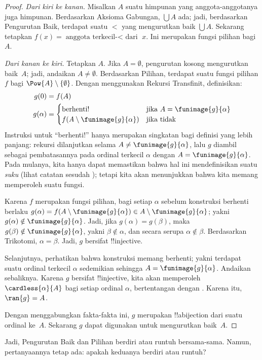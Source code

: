 \documentclass[../../../include/open-logic-section]{subfiles}
\begin{document}
\begin{proof}
\emph{Dari kiri ke kanan.} Misalkan $A$ suatu himpunan yang
anggota-anggotanya juga himpunan. Berdasarkan Aksioma Gabungan,
$\bigcup A$ ada; jadi, berdasarkan Pengurutan Baik, terdapat suatu $<$ yang
mengurutkan baik $\bigcup A$. Sekarang tetapkan
$f(x)=\text{anggota terkecil-$<$ dari }x$. Ini merupakan fungsi pilihan
bagi~$A$.

\emph{Dari kanan ke kiri.} Tetapkan $A$. Jika $A=\emptyset$, pengurutan
kosong mengurutkan baik~$A$; jadi, andaikan $A\neq\emptyset$. Berdasarkan
Pilihan, terdapat suatu fungsi pilihan $f$ bagi
$\Pow{A} \setminus \{\emptyset\}$. Dengan menggunakan Rekursi Transfinit,
definisikan:
\begin{align*}
	g(0) &= f(A)\\
	g(\alpha) &=
		\begin{cases}
			\text{berhenti!{}} &\text{jika }A = \funimage{g}{\alpha}\\
			f(A \setminus \funimage{g}{\alpha}) & \text{jika tidak}\\
		\end{cases}
\end{align*}
Instruksi untuk ``berhenti!'' hanya merupakan singkatan bagi definisi
yang lebih panjang: rekursi dilanjutkan selama
$A\neq\funimage{g}{\alpha}$, lalu $g$ diambil sebagai pembatasannya pada
ordinal terkecil $\alpha$ dengan $A=\funimage{g}{\alpha}$. Pada mulanya, kita
hanya dapat memastikan bahwa hal ini mendefinisikan suatu \emph{suku}
(lihat catatan sesudah
); tetapi kita akan
menunjukkan bahwa kita memang memperoleh suatu fungsi.

Karena $f$ merupakan fungsi pilihan, bagi setiap $\alpha$ sebelum konstruksi
berhenti berlaku
$g(\alpha)=f(A\setminus\funimage{g}{\alpha})\in
A\setminus\funimage{g}{\alpha}$; yakni
$g(\alpha)\notin\funimage{g}{\alpha}$. Jadi, jika
$g(\alpha)=g(\beta)$, maka $g(\beta)\notin\funimage{g}{\alpha}$, yakni
$\beta\notin\alpha$, dan secara serupa $\alpha\notin\beta$. Berdasarkan
Trikotomi, $\alpha=\beta$. Jadi, $g$ bersifat !!{injective}.

Selanjutnya, perhatikan bahwa konstruksi memang berhenti; yakni terdapat
suatu ordinal terkecil $\alpha$ sedemikian sehingga
$A=\funimage{g}{\alpha}$. Andaikan sebaliknya. Karena $g$ bersifat
!!{injective}, kita akan memperoleh $\cardless{\alpha}{A}$ bagi setiap
ordinal $\alpha$, bertentangan dengan . Karena
itu, $\ran{g}=A$.

Dengan menggabungkan fakta-fakta ini, $g$ merupakan !!a{bijection} dari
suatu ordinal ke~$A$. Sekarang $g$ dapat digunakan untuk mengurutkan
baik~$A$.
\end{proof}

Jadi, Pengurutan Baik dan Pilihan berdiri atau runtuh bersama-sama. Namun,
pertanyaannya tetap ada: apakah keduanya berdiri atau runtuh?
\end{document}
